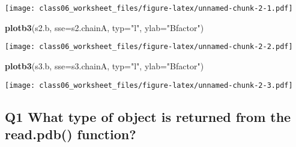\documentclass[]{article}
\newenvironment{Shaded}{\begin{snugshade}}{\end{snugshade}}
\newcommand{\KeywordTok}[1]{\textcolor[rgb]{0.13,0.29,0.53}{\textbf{#1}}}
\newcommand{\DataTypeTok}[1]{\textcolor[rgb]{0.13,0.29,0.53}{#1}}
\newcommand{\StringTok}[1]{\textcolor[rgb]{0.31,0.60,0.02}{#1}}
\newcommand{\OperatorTok}[1]{\textcolor[rgb]{0.81,0.36,0.00}{\textbf{#1}}}
\newcommand{\NormalTok}[1]{#1}
\begin{document}
\begin{Shaded}
\end{Shaded}

\texttt{[image: class06\_worksheet\_files/figure-latex/unnamed-chunk-2-1.pdf]}

\begin{Shaded}
\begin{Highlighting}[]
\KeywordTok{plotb3}\NormalTok{(s2.b, }\DataTypeTok{sse=}\NormalTok{s2.chainA, }\DataTypeTok{typ=}\StringTok{"l"}\NormalTok{, }\DataTypeTok{ylab=}\StringTok{"Bfactor"}\NormalTok{)}
\end{Highlighting}
\end{Shaded}

\texttt{[image: class06\_worksheet\_files/figure-latex/unnamed-chunk-2-2.pdf]}

\begin{Shaded}
\begin{Highlighting}[]
\KeywordTok{plotb3}\NormalTok{(s3.b, }\DataTypeTok{sse=}\NormalTok{s3.chainA, }\DataTypeTok{typ=}\StringTok{"l"}\NormalTok{, }\DataTypeTok{ylab=}\StringTok{"Bfactor"}\NormalTok{)}
\end{Highlighting}
\end{Shaded}

\texttt{[image: class06\_worksheet\_files/figure-latex/unnamed-chunk-2-3.pdf]}

\subsection{Q1 What type of object is returned from the read.pdb()
function?}\label{q1-what-type-of-object-is-returned-from-the-read.pdb-function}
\end{document}
